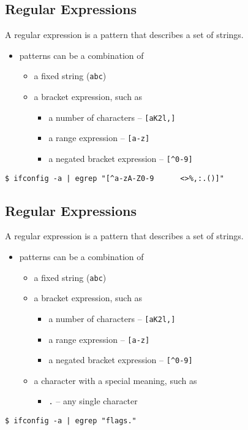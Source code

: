 \documentclass[xga]{xdvislides}
\begin{document}
\subsection{Regular Expressions}
A regular expression is a pattern that describes a set of strings. \\

\begin{itemize}
	\item patterns can be a combination of
		\begin{itemize}
			\item a fixed string (\verb+abc+)
			\item a bracket expression, such as
				\begin{itemize}
					\item a number of characters -- \verb+[aK2l,]+
					\item a range expression -- \verb+[a-z]+
					\item a negated bracket expression -- \verb+[^0-9]+
				\end{itemize}
		\end{itemize}
\end{itemize}
\vspace{.5in}
\begin{verbatim}
$ ifconfig -a | egrep "[^a-zA-Z0-9      <>%,:.()]"
\end{verbatim}



\subsection{Regular Expressions}
A regular expression is a pattern that describes a set of strings. \\

\begin{itemize}
	\item patterns can be a combination of
		\begin{itemize}
			\item a fixed string (\verb+abc+)
			\item a bracket expression, such as
				\begin{itemize}
					\item a number of characters -- \verb+[aK2l,]+
					\item a range expression -- \verb+[a-z]+
					\item a negated bracket expression -- \verb+[^0-9]+
				\end{itemize}
			\item a character with a special meaning, such as
				\begin{itemize}
					\item \verb+.+ -- any single character
				\end{itemize}
		\end{itemize}
\end{itemize}
\vspace{.5in}
\begin{verbatim}
$ ifconfig -a | egrep "flags."
\end{verbatim}
\end{document}
